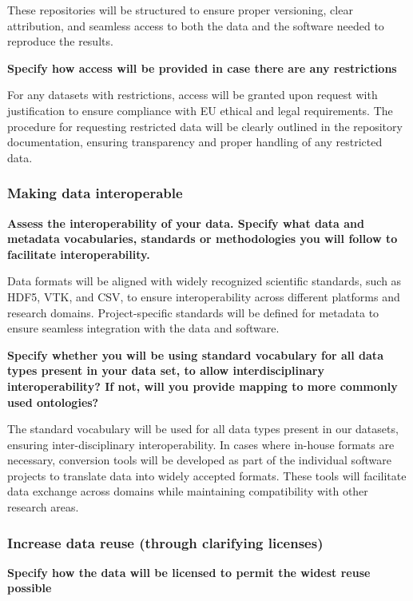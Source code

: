 \documentclass[a4paper,12pt]{article}
\begin{document}
These repositories will be structured to ensure proper versioning, clear attribution, and seamless access to both the data and the software needed to reproduce the results.


\noindent \textbf{Specify how access will be provided in case there are any restrictions}

For any datasets with restrictions, access will be granted upon request with justification to ensure compliance with EU ethical and legal requirements. The procedure for requesting restricted data will be clearly outlined in the repository documentation, ensuring transparency and proper handling of any restricted data.

\subsubsection{Making data interoperable}

\noindent \textbf{Assess the interoperability of your data. Specify what data and metadata vocabularies, standards or methodologies you will follow to facilitate interoperability.}

Data formats will be aligned with widely recognized scientific standards, such as HDF5, VTK, and CSV, to ensure interoperability across different platforms and research domains. Project-specific standards will be defined for metadata to ensure seamless integration with the data and software.

\noindent \textbf{Specify whether you will be using standard vocabulary for all data types present in your data set, to allow interdisciplinary interoperability? If not, will you provide mapping to more commonly used ontologies?}

The standard vocabulary will be used for all data types present in our datasets, ensuring inter-disciplinary interoperability. In cases where in-house formats are necessary, conversion tools will be developed as part of the individual software projects to translate data into widely accepted formats. These tools will facilitate data exchange across domains while maintaining compatibility with other research areas.



\subsubsection{Increase data reuse (through clarifying licenses)}

\noindent \textbf{Specify how the data will be licensed to permit the widest reuse possible}
\end{document}
